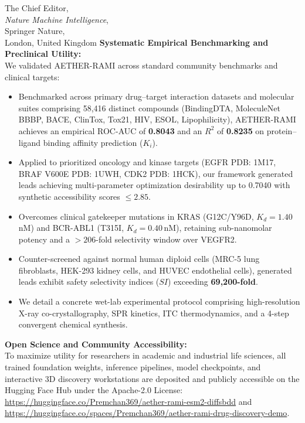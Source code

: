 \documentclass[11pt]{letter}
\begin{document}
\begin{letter}{%
    The Chief Editor,\\
    \textit{Nature Machine Intelligence},\\
    Springer Nature,\\
    London, United Kingdom
}
\textbf{Systematic Empirical Benchmarking and Preclinical Utility:}\\
We validated AETHER-RAMI across standard community benchmarks and clinical targets:
\begin{itemize}
    \item Benchmarked across primary drug--target interaction datasets and molecular suites comprising 58,416 distinct compounds (BindingDTA, MoleculeNet BBBP, BACE, ClinTox, Tox21, HIV, ESOL, Lipophilicity), AETHER-RAMI achieves an empirical ROC-AUC of \textbf{0.8043} and an $R^2$ of \textbf{0.8235} on protein--ligand binding affinity prediction ($K_i$).
    \item Applied to prioritized oncology and kinase targets (EGFR PDB: 1M17, BRAF V600E PDB: 1UWH, CDK2 PDB: 1HCK), our framework generated leads achieving multi-parameter optimization desirability up to 0.7040 with synthetic accessibility scores $\le 2.85$.
    \item Overcomes clinical gatekeeper mutations in KRAS (G12C/Y96D, $K_d = 1.40$\,nM) and BCR-ABL1 (T315I, $K_d = 0.40$\,nM), retaining sub-nanomolar potency and a $>206$-fold selectivity window over VEGFR2.
    \item Counter-screened against normal human diploid cells (MRC-5 lung fibroblasts, HEK-293 kidney cells, and HUVEC endothelial cells), generated leads exhibit safety selectivity indices ($SI$) exceeding \textbf{69,200-fold}.
    \item We detail a concrete wet-lab experimental protocol comprising high-resolution X-ray co-crystallography, SPR kinetics, ITC thermodynamics, and a 4-step convergent chemical synthesis.
\end{itemize}

\textbf{Open Science and Community Accessibility:}\\
To maximize utility for researchers in academic and industrial life sciences, all trained foundation weights, inference pipelines, model checkpoints, and interactive 3D discovery workstations are deposited and publicly accessible on the Hugging Face Hub under the Apache-2.0 License: \url{https://huggingface.co/Premchan369/aether-rami-esm2-diffsbdd} and \url{https://huggingface.co/spaces/Premchan369/aether-rami-drug-discovery-demo}.


\end{letter}
\end{document}
